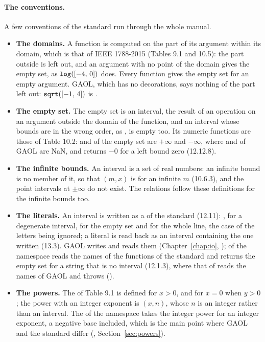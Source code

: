 \documentclass[12pt,a4paper,twoside,openright]{book}
\begin{document}
\paragraph{The conventions.} A few conventions of the standard run through
the whole manual.
\begin{itemize}
\item[$\bullet$] \textbf{The domains.} A function is computed on the part
  of its argument within its domain, which is that of IEEE 1788-2015
  (Tables 9.1 and 10.5): the part outside is left out, and an argument with
  no point of the domain gives the empty set, as $\texttt{log}([-4,\,0])$
  does.\newinvfive{} Every function gives the empty set for an empty
  argument. GAOL, which has no decorations, says nothing of the part left
  out: $\texttt{sqrt}([-1,\,4])$ is .
\item[$\bullet$] \textbf{The empty set.} The empty set is an interval, the
  result of an operation on an argument outside the domain of the function,
  and an interval whose bounds are in the wrong order, as
  , is empty too. Its numeric functions are those of
  Table 10.2:  and  of the empty set are $+\infty$ and
  $-\infty$, where  and  of GAOL are NaN, and
   returns $-0$ for a left bound zero (12.12.8).
\item[$\bullet$] \textbf{The infinite bounds.} An interval is a set of
  real numbers: an infinite bound is no member of it, so that
  $(m, x)$ is  for an infinite $m$ (10.6.3), and
  the point intervals at $\pm\infty$ do not exist. The relations follow
  these definitions for the infinite bounds too.
\item[$\bullet$] \textbf{The literals.} An interval is written as a
   of the standard (12.11): \code{[l, r]}, \code{[a]} for a
  degenerate interval, \code{[empty]} for the empty set and \code{[entire]}
  for the whole line, the case of the letters being ignored; a literal is
  read back as an interval containing the one written (13.3). GAOL writes
  and reads them (Chapter~\ref{chap:io}, );
   of the namespace  reads the
  names of the functions of the standard and returns the empty set for a
  string that is no interval (12.1.3), where that of  reads the
  names of GAOL and throws ().\newinvfive
\item[$\bullet$] \textbf{The powers.} The  of Table 9.1 is
  defined for $x>0$, and for $x=0$ when $y>0$; the power with an integer
  exponent is $(x, n)$, whose $n$ is an integer rather than an
  interval. The  of the namespace  takes the integer
  power for an integer exponent, a negative base included, which is the
  main point where GAOL and the standard differ (,
  Section~\ref{sec:powers}).
\end{itemize}
\end{document}
